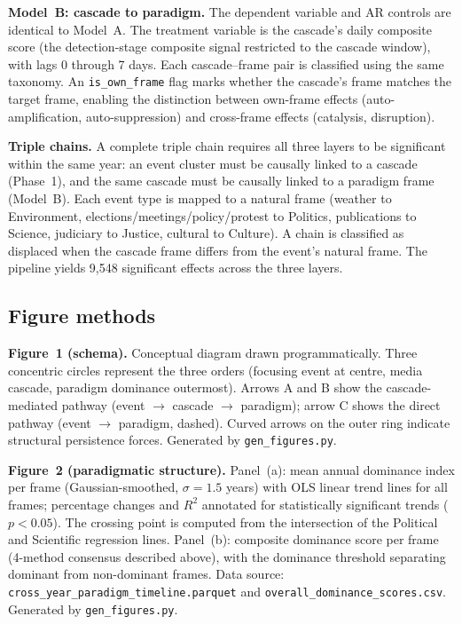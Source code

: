 \textbf{Model~B: cascade to paradigm.} The dependent variable and AR controls are identical to Model~A. The treatment variable is the cascade's daily composite score (the detection-stage composite signal restricted to the cascade window), with lags 0 through 7 days. Each cascade--frame pair is classified using the same taxonomy. An \texttt{is\_own\_frame} flag marks whether the cascade's frame matches the target frame, enabling the distinction between own-frame effects (auto-amplification, auto-suppression) and cross-frame effects (catalysis, disruption).

\textbf{Triple chains.} A complete triple chain requires all three layers to be significant within the same year: an event cluster must be causally linked to a cascade (Phase~1), and the same cascade must be causally linked to a paradigm frame (Model~B). Each event type is mapped to a natural frame (weather to Environment, elections/meetings/policy/protest to Politics, publications to Science, judiciary to Justice, cultural to Culture). A chain is classified as displaced when the cascade frame differs from the event's natural frame. The pipeline yields 9,548 significant effects across the three layers.

\subsection*{Figure methods}

\textbf{Figure~1 (schema).} Conceptual diagram drawn programmatically. Three concentric circles represent the three orders (focusing event at centre, media cascade, paradigm dominance outermost). Arrows A and B show the cascade-mediated pathway (event $\to$ cascade $\to$ paradigm); arrow C shows the direct pathway (event $\to$ paradigm, dashed). Curved arrows on the outer ring indicate structural persistence forces. Generated by \texttt{gen\_figures.py}.

\textbf{Figure~2 (paradigmatic structure).} Panel~(a): mean annual dominance index per frame (Gaussian-smoothed, $\sigma = 1.5$ years) with OLS linear trend lines for all frames; percentage changes and $R^2$ annotated for statistically significant trends ($p < 0.05$). The crossing point is computed from the intersection of the Political and Scientific regression lines. Panel~(b): composite dominance score per frame (4-method consensus described above), with the dominance threshold separating dominant from non-dominant frames. Data source: \texttt{cross\_year\_paradigm\_timeline.parquet} and \texttt{overall\_dominance\_scores.csv}. Generated by \texttt{gen\_figures.py}.

